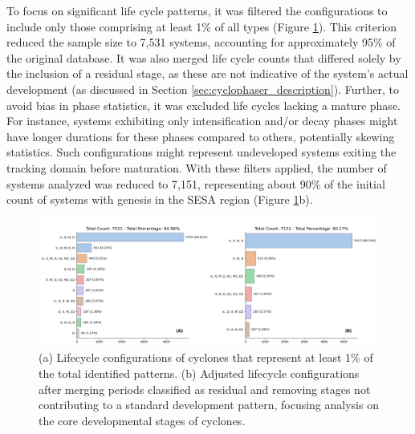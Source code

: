 To focus on significant life cycle patterns, it was filtered the configurations to include only those comprising at least 1\% of all types (Figure \ref{fig:filtered_lifecycle_configurations}). This criterion reduced the sample size to 7,531 systems, accounting for approximately 95\% of the original database. It was also merged life cycle counts that differed solely by the inclusion of a residual stage, as these are not indicative of the system's actual development (as discussed in Section \ref{sec:cyclophaser_description}). Further, to avoid bias in phase statistics, it was excluded life cycles lacking a mature phase. For instance, systems exhibiting only intensification and/or decay phases might have longer durations for these phases compared to others, potentially skewing statistics. Such configurations might represent undeveloped systems exiting the tracking domain before maturation. With these filters applied, the number of systems analyzed was reduced to 7,151, representing about 90\% of the initial count of systems with genesis in the SESA region (Figure \ref{fig:filtered_lifecycle_configurations}b).

\begin{figure}[ht]
\centering
\includegraphics[width=\textwidth]{figs_4/combined_barplots_filtered.png}
\caption[Filtered Life Cycle Configurations]{(a) Lifecycle configurations of cyclones that represent at least 1\% of the total identified patterns. (b) Adjusted lifecycle configurations after merging periods classified as residual and removing stages not contributing to a standard development pattern, focusing analysis on the core developmental stages of cyclones.}
\label{fig:filtered_lifecycle_configurations}
\end{figure}

